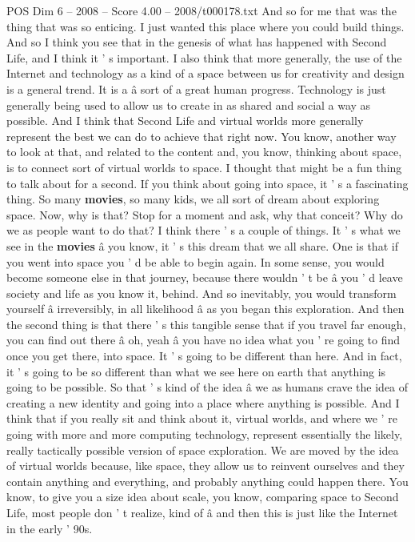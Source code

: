 \begin{textsample}{POS Dim 6 – 2008 – Score 4.00 – 2008/t000178.txt}
And so for me that was the thing that was so enticing.
I just wanted this place where you could build things.
And so I think you see that in the genesis of what has happened with Second Life, and I think it ' s important.
I also think that more generally, the use of the Internet and technology as a kind of a space between us for creativity and design is a general trend.
It is a â sort of a great human progress.
Technology is just generally being used to allow us to create in as shared and social a way as possible.
And I think that Second Life and virtual worlds more generally represent the best we can do to achieve that right now.
You know, another way to look at that, and related to the content and, you know, thinking about space, is to connect sort of virtual worlds to space.
I thought that might be a fun thing to talk about for a second.
If you think about going into space, it ' s a fascinating thing.
So many \textbf{movies}, so many kids, we all sort of dream about exploring space.
Now, why is that?
Stop for a moment and ask, why that conceit?
Why do we as people want to do that?
I think there ' s a couple of things.
It ' s what we see in the \textbf{movies} â you know, it ' s this dream that we all share.
One is that if you went into space you ' d be able to begin again.
In some sense, you would become someone else in that journey, because there wouldn ' t be â you ' d leave society and life as you know it, behind.
And so inevitably, you would transform yourself â irreversibly, in all likelihood â as you began this exploration.
And then the second thing is that there ' s this tangible sense that if you travel far enough, you can find out there â oh, yeah â you have no idea what you ' re going to find once you get there, into space.
It ' s going to be different than here.
And in fact, it ' s going to be so different than what we see here on earth that anything is going to be possible.
So that ' s kind of the idea â we as humans crave the idea of creating a new identity and going into a place where anything is possible.
And I think that if you really sit and think about it, virtual worlds, and where we ' re going with more and more computing technology, represent essentially the likely, really tactically possible version of space exploration.
We are moved by the idea of virtual worlds because, like space, they allow us to reinvent ourselves and they contain anything and everything, and probably anything could happen there.
You know, to give you a size idea about scale, you know, comparing space to Second Life, most people don ' t realize, kind of â and then this is just like the Internet in the early ' 90s.

\end{textsample}
